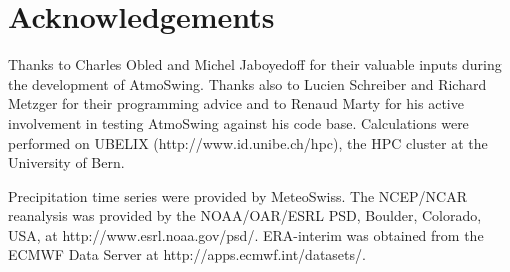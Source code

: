 \documentclass[review]{elsarticle}
\begin{document}
\section*{Acknowledgements}
Thanks to Charles Obled and Michel Jaboyedoff for their valuable inputs during the development of AtmoSwing. Thanks also to Lucien Schreiber and Richard Metzger for their programming advice and to Renaud Marty for his active involvement in testing AtmoSwing against his code base. Calculations were performed on UBELIX (http://www.id.unibe.ch/hpc), the HPC cluster at the University of Bern. 

Precipitation time series were provided by MeteoSwiss. The NCEP/NCAR reanalysis was provided by the NOAA/OAR/ESRL PSD, Boulder, Colorado, USA, at http://www.esrl.noaa.gov/psd/. ERA-interim was obtained from the ECMWF Data Server at http://apps.ecmwf.int/datasets/. 





\clearpage

	
\end{document}
